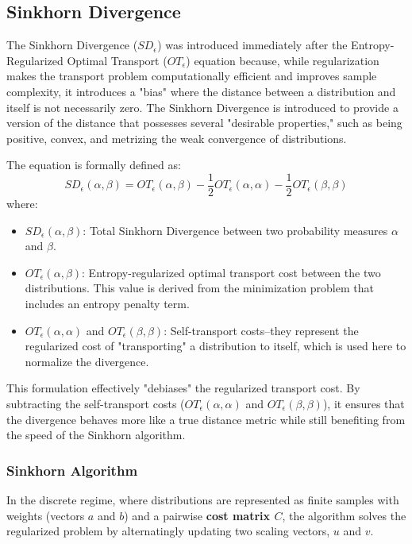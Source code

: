 \documentclass[11pt, a4paper]{article}
\theoremstyle{plain} %
\theoremstyle{definition} %
\begin{document}
		\subsection{Sinkhorn Divergence}
		\label{sec:sinkhorn_divergence}
			The Sinkhorn Divergence ($SD_\epsilon$) was introduced immediately after the Entropy-Regularized Optimal Transport ($OT_\epsilon$) equation because, while regularization makes the transport problem computationally efficient and improves sample complexity, it introduces a "bias" where the distance between a distribution and itself is not necessarily zero. The Sinkhorn Divergence is introduced to provide a version of the distance that possesses several "desirable properties," such as being positive, convex, and metrizing the weak convergence of distributions.

			The equation is formally defined as:
			\begin{equation}
				\label{eq:sinkhorn_divergence}
				SD_\epsilon(\alpha, \beta) = OT_\epsilon(\alpha, \beta) - \frac{1}{2} OT_\epsilon(\alpha, \alpha) - \frac{1}{2} OT_\epsilon(\beta, \beta)
			\end{equation}
			where:
			\begin{itemize}
				\item $SD_\epsilon(\alpha, \beta)$: Total Sinkhorn Divergence between two probability measures $\alpha$ and $\beta$.
				\item $OT_\epsilon(\alpha, \beta)$: Entropy-regularized optimal transport cost between the two distributions. This value is derived from the minimization problem that includes an entropy penalty term.
				\item $OT_\epsilon(\alpha, \alpha)$ and $OT_\epsilon(\beta, \beta)$: Self-transport costs--they represent the regularized cost of "transporting" a distribution to itself, which is used here to normalize the divergence.
			\end{itemize}
			This formulation effectively "debiases" the regularized transport cost. By subtracting the self-transport costs ($OT_\epsilon(\alpha, \alpha)$ and $OT_\epsilon(\beta, \beta)$), it ensures that the divergence behaves more like a true distance metric while still benefiting from the speed of the Sinkhorn algorithm.

			\subsubsection{Sinkhorn Algorithm}
			\label{sec:sinkhorn_algorithm}
				In the discrete regime, where distributions are represented as finite samples with weights (vectors $a$ and $b$) and a pairwise \textbf{cost matrix $C$}, the algorithm solves the regularized problem by alternatingly updating two scaling vectors, $u$ and $v$.
\end{document}
